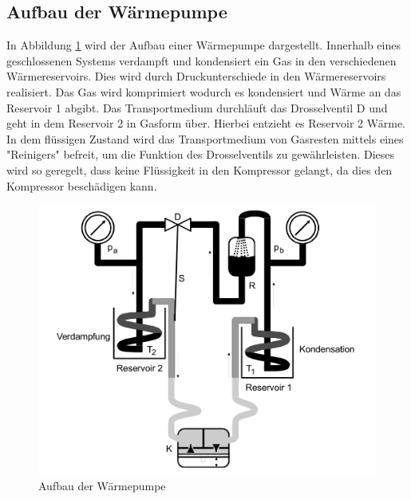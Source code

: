 \subsection{Aufbau der Wärmepumpe}
\label{sec:AdW}
In Abbildung \ref{fig:aufbau} wird der Aufbau einer Wärmepumpe dargestellt.
Innerhalb eines geschlossenen Systems verdampft und kondensiert ein Gas in den verschiedenen Wärmereservoirs.
Dies wird durch Druckunterschiede in den Wärmereservoirs realisiert.
Das Gas wird komprimiert wodurch es kondensiert und Wärme an das Reservoir 1 abgibt.
Das Transportmedium durchläuft das Drosselventil D und geht in dem Reservoir 2 in Gasform über.
Hierbei entzieht es Reservoir 2 Wärme.
In dem flüssigen Zustand wird das Transportmedium von Gasresten mittels eines "Reinigers" befreit, um die Funktion des
Drosselventils zu gewährleisten.
Dieses wird so geregelt, dass keine Flüssigkeit in den Kompressor gelangt, da dies den Kompressor beschädigen kann.
\begin{figure}[H]
    \centering
    \includegraphics[width=\textwidth]{content/aufbau.png}
    \caption{Aufbau der Wärmepumpe\cite{v206}}
    \label{fig:aufbau}
\end{figure}
